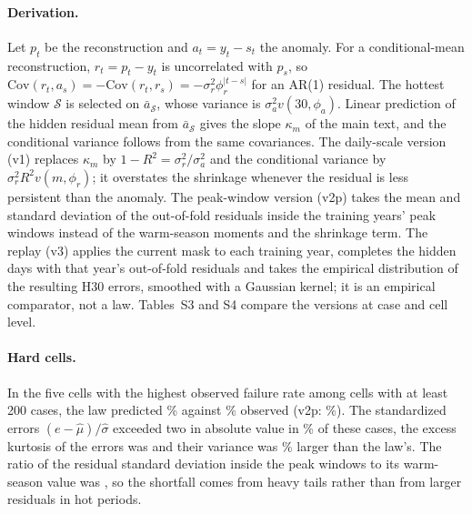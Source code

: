 \documentclass[draft]{agujournal2025}
\begin{document}
\paragraph{Derivation.} Let $p_t$ be the reconstruction and $a_t = y_t - s_t$ the anomaly. For a conditional-mean reconstruction, $r_t = p_t - y_t$ is uncorrelated with $p_s$, so $\mathrm{Cov}(r_t, a_s) = -\mathrm{Cov}(r_t, r_s) = -\sigma_r^2\phi_r^{|t-s|}$ for an AR(1) residual. The hottest window $\mathcal S$ is selected on $\bar a_{\mathcal S}$, whose variance is $\sigma_a^2 v(30,\phi_a)$. Linear prediction of the hidden residual mean from $\bar a_{\mathcal S}$ gives the slope $\kappa_m$ of the main text, and the conditional variance follows from the same covariances. The daily-scale version (v1) replaces $\kappa_m$ by $1-R^2 = \sigma_r^2/\sigma_a^2$ and the conditional variance by $\sigma_r^2 R^2 v(m,\phi_r)$; it overstates the shrinkage whenever the residual is less persistent than the anomaly. The peak-window version (v2p) takes the mean and standard deviation of the out-of-fold residuals inside the training years' peak windows instead of the warm-season moments and the shrinkage term. The replay (v3) applies the current mask to each training year, completes the hidden days with that year's out-of-fold residuals and takes the empirical distribution of the resulting H30 errors, smoothed with a Gaussian kernel; it is an empirical comparator, not a law. Tables~S3 and S4 compare the versions at case and cell level.

\paragraph{Hard cells.} In the five cells with the highest observed failure rate among cells with at least 200 cases, the law predicted \THardVTwo\% against \THardObserved\% observed (v2p: \THardVTwoP\%). The standardized errors $(e-\hat\mu)/\hat\sigma$ exceeded two in absolute value in \THardBeyond\% of these cases, the excess kurtosis of the errors was \THardKurtosis{} and their variance was \THardVariance\% larger than the law's. The ratio of the residual standard deviation inside the peak windows to its warm-season value was \THardHetero, so the shortfall comes from heavy tails rather than from larger residuals in hot periods.
\end{document}
